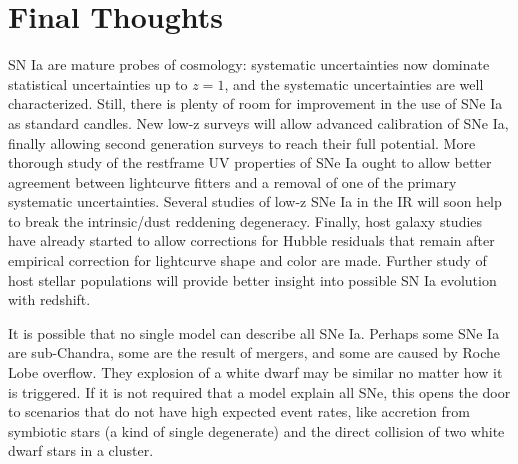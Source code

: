 \documentclass{nature1}
\begin{document}

\section{Final Thoughts}
SN Ia are mature probes of cosmology: systematic uncertainties now dominate
statistical uncertainties up to $z=1$, and the systematic uncertainties are well
characterized.  Still, there is plenty of room for improvement in the
use of SNe Ia as standard candles.  New low-z surveys will allow
advanced calibration of SNe Ia, finally allowing second generation
surveys to reach their full potential.  More thorough study of the
restframe UV properties of SNe Ia ought to allow better agreement
between lightcurve fitters and a removal of one of the primary
systematic uncertainties.  Several studies of low-z SNe Ia in the IR will
soon help to break the intrinsic/dust reddening degeneracy.  Finally,
host galaxy studies have already started to allow corrections for
Hubble residuals that remain after empirical correction for lightcurve
shape and color are made.  Further study of host stellar populations
will provide better insight into possible SN Ia evolution with
redshift.

It is possible that no single model can describe all SNe Ia.  Perhaps
some SNe Ia are sub-Chandra, some are the result of mergers, and some
are caused by Roche Lobe overflow.  They explosion of a white dwarf
may be similar no matter how it is triggered.  If it is not required
that a model explain all SNe, this opens the door to scenarios that do
not have high expected event rates, like accretion from symbiotic
stars (a kind of single degenerate) and the direct collision of two
white dwarf stars in a cluster\citep{2009ApJ...705L.128R}.
\end{document}
